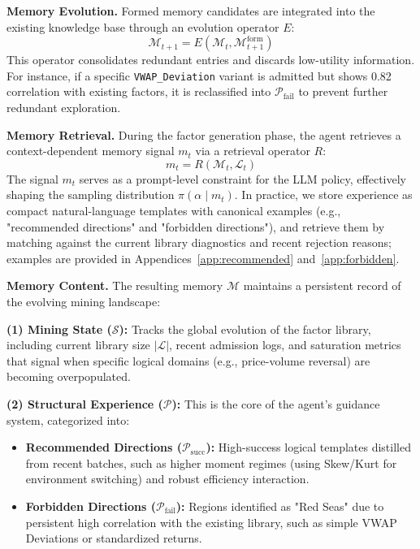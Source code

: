 \documentclass[sigconf]{acmart}
\begin{document}
\textbf{Memory Evolution.}
Formed memory candidates are integrated into the existing knowledge base through an evolution operator $E$:
\begin{equation}
\mathcal{M}_{t+1} = E(\mathcal{M}_t, \mathcal{M}_{t+1}^{\text{form}})
\end{equation}
This operator consolidates redundant entries and discards low-utility information. For instance, if a specific \texttt{VWAP\_Deviation} variant is admitted but shows 0.82 correlation with existing factors, it is reclassified into $\mathcal{P}_{\text{fail}}$ to prevent further redundant exploration.

\textbf{Memory Retrieval.}
During the factor generation phase, the agent retrieves a context-dependent memory signal $m_t$ via a retrieval operator $R$:
\begin{equation}
m_t = R(\mathcal{M}_t, \mathcal{L}_t)
\end{equation}
The signal $m_t$ serves as a prompt-level constraint for the LLM policy, effectively shaping the sampling distribution $\pi(\alpha \mid m_t)$. 
In practice, we store experience as compact natural-language templates with canonical examples (e.g., "recommended directions" and "forbidden directions"), and retrieve them by matching against the current library diagnostics and recent rejection reasons; examples are provided in Appendices~\ref{app:recommended} and~\ref{app:forbidden}.

\textbf{Memory Content.}
The resulting memory $\mathcal{M}$ maintains a persistent record of the evolving mining landscape:

\textbf{(1) Mining State ($\mathcal{S}$):} Tracks the global evolution of the factor library, including current library size $|\mathcal{L}|$, recent admission logs, and saturation metrics that signal when specific logical domains (e.g., price-volume reversal) are becoming overpopulated.

\textbf{(2) Structural Experience ($\mathcal{P}$):} This is the core of the agent's guidance system, categorized into:
{\setlength{\leftmargini}{1.4em}%
\begin{itemize}
    \item \textbf{Recommended Directions ($\mathcal{P}_{\text{succ}}$):} High-success logical templates distilled from recent batches, such as higher moment regimes (using Skew/Kurt for environment switching) and robust efficiency interaction.
    \item \textbf{Forbidden Directions ($\mathcal{P}_{\text{fail}}$):} Regions identified as "Red Seas" due to persistent high correlation with the existing library, such as simple VWAP Deviations or standardized returns.
\end{itemize}
}
\end{document}
